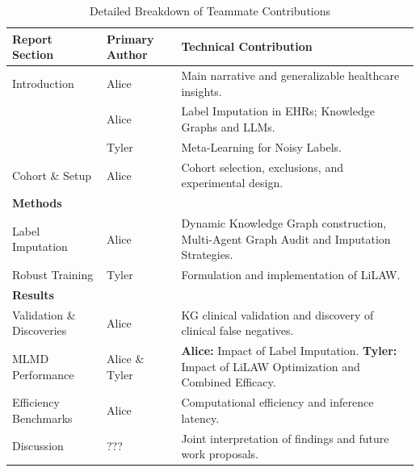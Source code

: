 \documentclass[pmlr]{jmlr}%
\begin{document}
\begin{table}[ht]
\centering
\caption{Detailed Breakdown of Teammate Contributions}
\label{tab:contributions}
\begin{tabularx}{\textwidth}{@{} l l X @{}}
\toprule
\textbf{Report Section} & \textbf{Primary Author} & \textbf{Technical Contribution} \\
\midrule

Introduction & Alice & Main narrative and generalizable healthcare insights. \\ \addlinespace

\multirow{2}{*}{Related Work} & Alice & Label Imputation in EHRs; Knowledge Graphs and LLMs. \\
& Tyler & Meta-Learning for Noisy Labels. \\ \addlinespace

Cohort \& Setup & Alice & Cohort selection, exclusions, and experimental design. \\ \addlinespace

\midrule
\textbf{Methods} & & \\
Label Imputation & Alice & Dynamic Knowledge Graph construction, Multi-Agent Graph Audit and Imputation Strategies. \\
Robust Training & Tyler & Formulation and implementation of LiLAW. \\ \addlinespace

\midrule
\textbf{Results} & & \\
Validation \& Discoveries & Alice & KG clinical validation and discovery of clinical false negatives. \\
MLMD Performance & Alice \& Tyler & \textbf{Alice:} Impact of Label Imputation. \newline \textbf{Tyler:} Impact of LiLAW Optimization and Combined Efficacy. \\
Efficiency Benchmarks & Alice & Computational efficiency and inference latency. \\ \addlinespace

\midrule
Discussion & ??? & Joint interpretation of findings and future work proposals. \\
\bottomrule
\end{tabularx}
\end{table}

\newpage
\end{document}

